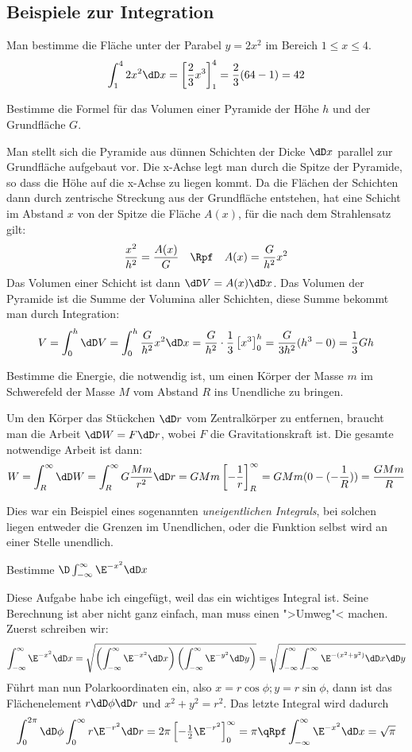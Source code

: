\subsection{Beispiele zur Integration}
\NA Man bestimme die Fläche unter der Parabel $y=2x^2$ im Bereich $1\le x\le
4$.
\[
\int_1^4 2x^2\dD x=\left[\frac{2}{3}x^3\right]_1^4=\frac{2}{3}(64-1)=42
\]

\NA Bestimme die Formel für das Volumen einer Pyramide der Höhe $h$ und der
Grundfläche $G$.

Man stellt sich die Pyramide aus dünnen Schichten der Dicke $\dD x$ parallel
zur Grundfläche aufgebaut vor. Die x-Achse legt man durch die Spitze der
Pyramide, so dass die Höhe auf die x-Achse zu liegen kommt. Da die Flächen der
Schichten dann durch zentrische Streckung aus der Grundfläche entstehen, hat
eine Schicht im Abstand $x$ von der Spitze die Fläche $A(x)$, für die nach dem
Strahlensatz gilt:
\[
\frac{x^2}{h^2}=\frac{A(x)}{G}\quad\Rpf\quad A(x)=\frac{G}{h^2} x^2
\]
Das Volumen einer Schicht ist dann $\dD V=A(x)\dD x$. Das Volumen der Pyramide
ist die Summe der Volumina aller Schichten, diese Summe bekommt man durch
Integration:
\[
V=\int_0^h \dD V=\int_0^h \frac{G}{h^2}x^2\dD x
=\frac{G}{h^2}\cdot\frac{1}{3}\left[x^3\right]_0^h=
\frac{G}{3h^2}(h^3-0)=\frac{1}{3}Gh
\]

\NA Bestimme die Energie, die notwendig ist, um einen Körper der Masse $m$ im
Schwerefeld der Masse $M$ vom Abstand $R$ ins Unendliche zu bringen.

Um den Körper das Stückchen $\dD r$ vom Zentralkörper zu entfernen, braucht
man die Arbeit $\dD W=F\dD r$, wobei $F$ die Gravitationskraft ist. Die gesamte
notwendige Arbeit ist dann:
\[
W=\int_R^{\infty}\dD W=\int_R^{\infty}G\frac{Mm}{r^2}\dD r=
GMm\left[-\frac{1}{r}\right]_R^{\infty}=GMm(0-(-\frac{1}{R}))=\frac{GMm}{R}
\]

Dies war ein Beispiel eines sogenannten \emph{uneigentlichen Integrals}, bei
solchen liegen entweder die Grenzen im Unendlichen, oder die Funktion selbst
wird an einer Stelle unendlich.

\NA Bestimme $ \D\int_{-\infty}^{\infty}\E^{-x^2}\dD x$

Diese Aufgabe habe ich eingefügt, weil das ein wichtiges Integral ist. Seine
Berechnung ist aber nicht ganz einfach, man muss einen ">Umweg"< machen.
Zuerst schreiben wir:
\[
\int_{-\infty}^{\infty}\E^{-x^2}\dD x=
\sqrt{\left(\int_{-\infty}^{\infty}\E^{-x^2}\dD x\right)
  \left(\int_{-\infty}^{\infty}\E^{-y^2}\dD y\right)}=
\sqrt{\int_{-\infty}^{\infty}\int_{-\infty}^{\infty}
    \E^{-(x^2+y^2)}\dD x\dD y}
\]
Führt man nun Polarkoordinaten ein, also $x=r\cos\phi; y=r\sin\phi$, dann ist
das Flächenelement $r\dD\phi\dD r$ und $x^2+y^2=r^2$. Das letzte Integral wird
dadurch
\[
\int_0^{2\pi}\dD\phi\int_0^{\infty}r\E^{-r^2}\dD r
=2\pi\left[-\tfrac12\E^{-r^2}\right]_0^{\infty}=\pi \qRpf
\int_{-\infty}^{\infty}\E^{-x^2}\dD x=\sqrt{\pi}
\]

